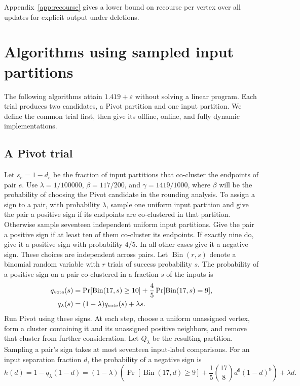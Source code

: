 \documentclass[11pt]{article}
\begin{document}
Appendix~\ref{app:recourse} gives a lower bound on recourse per vertex over all updates
for explicit output under deletions.




\clearpage
\appendix

\section{Algorithms using sampled input partitions}
\label{app:vote}

The following algorithms attain $1.419+\varepsilon$ without solving
a linear program. Each trial produces two candidates, a Pivot
partition and one input partition. We define the common trial
first, then give its offline, online, and fully dynamic
implementations.

\subsection{A Pivot trial}
\label{floor:section}

Let $s_e=1-d_e$ be the fraction of input partitions that co-cluster
the endpoints of pair $e$. Use
$\lambda=1/100000$, $\beta=117/200$, and $\gamma=1419/1000$, where
$\beta$ will be the probability of choosing the Pivot candidate in
the rounding analysis. To assign a sign to a pair, with probability
$\lambda$, sample one uniform input partition and give the pair a
positive sign if its endpoints are co-clustered in that partition.
Otherwise sample seventeen independent uniform input partitions. Give
the pair a positive sign if at least ten of them co-cluster its
endpoints. If exactly nine do, give it a positive sign with probability
$4/5$. In all other
cases give it a negative sign. These choices are independent across
pairs. Let $\operatorname{Bin}(r,s)$ denote a binomial random variable
with $r$ trials of success probability $s$. The probability of a
positive sign on a pair co-clustered in a fraction $s$ of the inputs is
\begin{align*}
 q_{\rm vote}(s)&=\Pr[\operatorname{Bin}(17,s)\ge10]
       +\frac45\Pr[\operatorname{Bin}(17,s)=9],\\
 q_\lambda(s)&=(1-\lambda)q_{\rm vote}(s)+\lambda s.
\end{align*}
Run Pivot using these signs. At each step, choose a uniform unassigned
vertex, form a cluster containing it and its unassigned positive
neighbors, and remove that cluster from further consideration. Let
$Q_\lambda$ be the resulting partition. Sampling a pair's sign takes
at most seventeen input-label comparisons. For an input separation
fraction $d$, the probability of a negative sign is
\begin{equation}\label{floor:h}
 h(d)=1-q_\lambda(1-d)
 =(1-\lambda)\left(\Pr[\operatorname{Bin}(17,d)\ge9]
 +\frac15\binom{17}{8}d^8(1-d)^9\right)+\lambda d.
\end{equation}
\end{document}
